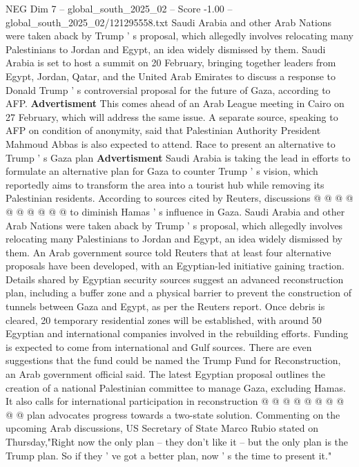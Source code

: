 \begin{textsample}{NEG Dim 7 – global\_south\_2025\_02 – Score -1.00 – global\_south\_2025\_02/121295558.txt}  \label{ex:f7_neg_040}
Saudi Arabia and other Arab Nations were taken aback by Trump ' s proposal, which allegedly involves relocating many Palestinians to Jordan and Egypt, an idea widely dismissed by them.
Saudi Arabia is set to host a summit on 20 February, bringing together leaders from Egypt, Jordan, Qatar, and the United Arab Emirates to discuss a response to Donald Trump ' s controversial proposal for the future of Gaza, according to AFP. \textbf{Advertisment} This comes ahead of an Arab League meeting in Cairo on 27 February, which will address the same issue.
A separate source, speaking to AFP on condition of anonymity, said that Palestinian Authority President Mahmoud Abbas is also expected to attend.
Race to present an alternative to Trump ' s Gaza plan \textbf{Advertisment} Saudi Arabia is taking the lead in efforts to formulate an alternative plan for Gaza to counter Trump ' s vision, which reportedly aims to transform the area into a tourist hub while removing its Palestinian residents.
According to sources cited by Reuters, discussions @ @ @ @ @ @ @ @ @ @ to diminish Hamas ' s influence in Gaza.
Saudi Arabia and other Arab Nations were taken aback by Trump ' s proposal, which allegedly involves relocating many Palestinians to Jordan and Egypt, an idea widely dismissed by them.
An Arab government source told Reuters that at least four alternative proposals have been developed, with an Egyptian-led initiative gaining traction.
Details shared by Egyptian security sources suggest an advanced reconstruction plan, including a buffer zone and a physical barrier to prevent the construction of tunnels between Gaza and Egypt, as per the Reuters report.
Once debris is cleared, 20 temporary residential zones will be established, with around 50 Egyptian and international companies involved in the rebuilding efforts.
Funding is expected to come from international and Gulf sources.
There are even suggestions that the fund could be named the Trump Fund for Reconstruction, an Arab government official said.
The latest Egyptian proposal outlines the creation of a national Palestinian committee to manage Gaza, excluding Hamas.
It also calls for international participation in reconstruction @ @ @ @ @ @ @ @ @ @ plan advocates progress towards a two-state solution.
Commenting on the upcoming Arab discussions, US Secretary of State Marco Rubio stated on Thursday,"Right now the only plan -- they don't like it -- but the only plan is the Trump plan.
So if they ' ve got a better plan, now ' s the time to present it."

\end{textsample}
